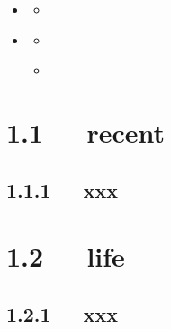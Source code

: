\documentclass[letterpaper,12pt,english]{sphinxmanual}
\begin{document}
\begin{sphinxShadowBox}
\begin{itemize}
\begin{itemize}
\begin{itemize}
\end{itemize}

\item {} 
\label{\detokenize{000misc/memo:id30}}{\hyperref[\detokenize{000misc/memo:misc}]{}}
\begin{itemize}
\item {} 
\label{\detokenize{000misc/memo:id31}}{\hyperref[\detokenize{000misc/memo:id5}]{}}

\end{itemize}

\item {} 
\label{\detokenize{000misc/memo:id32}}{\hyperref[\detokenize{000misc/memo:temp}]{}}
\begin{itemize}
\item {} 
\label{\detokenize{000misc/memo:id33}}{\hyperref[\detokenize{000misc/memo:id6}]{}}

\item {} 
\label{\detokenize{000misc/memo:id34}}{\hyperref[\detokenize{000misc/memo:raw-materials}]{}}

\end{itemize}

\end{itemize}

\end{itemize}
\end{sphinxShadowBox}


\section{1.1   recent}
\label{\detokenize{000misc/memo:recent}}

\subsection{1.1.1   xxx}
\label{\detokenize{000misc/memo:xxx}}

\section{1.2   life}
\label{\detokenize{000misc/memo:life}}

\subsection{1.2.1   xxx}
\label{\detokenize{000misc/memo:id2}}
\end{document}
